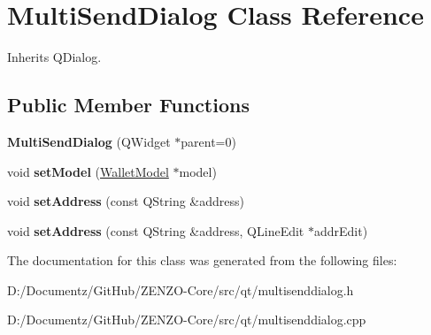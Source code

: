 \hypertarget{class_multi_send_dialog}{}\section{Multi\+Send\+Dialog Class Reference}
\label{class_multi_send_dialog}


Inherits Q\+Dialog.

\subsection*{Public Member Functions}
\begin{DoxyCompactItemize}
\item 
\mbox{\label{class_multi_send_dialog_a496bc521a761a49ef3e158e524bed22a}} 
{\bfseries Multi\+Send\+Dialog} (Q\+Widget $\ast$parent=0)
\item 
\mbox{\label{class_multi_send_dialog_aef8d0e5e3399fa8053ab5a0e38eae152}} 
void {\bfseries set\+Model} (\mbox{\hyperlink{class_wallet_model}{Wallet\+Model}} $\ast$model)
\item 
\mbox{\label{class_multi_send_dialog_acc93dd843ead555a3c6eac6b8c91e777}} 
void {\bfseries set\+Address} (const Q\+String \&address)
\item 
\mbox{\label{class_multi_send_dialog_a7db24574d514cbd14814a077f7cd6516}} 
void {\bfseries set\+Address} (const Q\+String \&address, Q\+Line\+Edit $\ast$addr\+Edit)
\end{DoxyCompactItemize}


The documentation for this class was generated from the following files\+:\begin{DoxyCompactItemize}
\item 
D\+:/\+Documentz/\+Git\+Hub/\+Z\+E\+N\+Z\+O-\/\+Core/src/qt/multisenddialog.\+h\item 
D\+:/\+Documentz/\+Git\+Hub/\+Z\+E\+N\+Z\+O-\/\+Core/src/qt/multisenddialog.\+cpp\end{DoxyCompactItemize}

